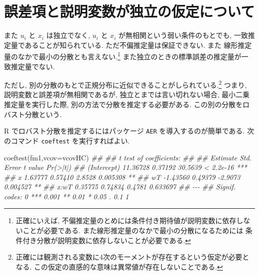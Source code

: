 \documentclass[
  letterpaper,
  xelatex,
  ja=standard, xelatex]{bxjsbook}
\newenvironment{Shaded}{\begin{snugshade}}{\end{snugshade}}
\newcommand{\AttributeTok}[1]{\textcolor[rgb]{0.40,0.45,0.13}{#1}}
\newcommand{\DocumentationTok}[1]{\textcolor[rgb]{0.37,0.37,0.37}{\textit{#1}}}
\newcommand{\FunctionTok}[1]{\textcolor[rgb]{0.28,0.35,0.67}{#1}}
\newcommand{\NormalTok}[1]{\textcolor[rgb]{0.00,0.23,0.31}{#1}}
\begin{document}
\section{誤差項と説明変数が独立の仮定について}\label{ux8aa4ux5deeux9805ux3068ux8aacux660eux5909ux6570ux304cux72ecux7acbux306eux4eeeux5b9aux306bux3064ux3044ux3066}

また \(u_i\) と \(x_i\) は独立でなく, \(u_i\) と \(x_i\)
が無相関という弱い条件のもとでも, 一致推定量であることが知られている.
ただ不偏推定量は保証できない. また
線形推定量のなかで最小の分散とも言えない.\footnote{正確にいえば,
  不偏推定量のとめには条件付き期待値が説明変数に依存しないことが必要である.
  また線形推定量のなかで最小の分散になるためには
  条件付き分散が説明変数に依存しないことが必要である.}
また独立のときの標準誤差の推定量が一致推定量でない.

ただし,
別の分散のもとで正規分布に近似できることがしられている.\footnote{正確には観測される変数に4次のモーメントが存在するという仮定が必要となる.
  この仮定の直感的な意味は異常値が存在しないことである.} つまり,
説明変数と誤差項が無相関であるが, 独立とまでは言い切れない場合,
最小二乗推定量を実行した際, 別の方法で分散を推定する必要がある.
この別の分散をロバスト分散という.

R でロバスト分散を推定するにはパッケージ \texttt{AER}
を導入するのが簡単である. 次のコマンド \texttt{coeftest}
を実行すればよい.

\begin{Shaded}
\begin{Highlighting}[]
\FunctionTok{coeftest}\NormalTok{(fm1,}\AttributeTok{vcov=}\NormalTok{vcovHC)}
\DocumentationTok{\#\# }
\DocumentationTok{\#\# t test of coefficients:}
\DocumentationTok{\#\# }
\DocumentationTok{\#\#             Estimate Std. Error t value  Pr(\textgreater{}|t|)    }
\DocumentationTok{\#\# (Intercept) 11.36728    0.37192 30.5639 \textless{} 2.2e{-}16 ***}
\DocumentationTok{\#\# x            1.63777    0.57410  2.8528  0.005308 ** }
\DocumentationTok{\#\# wT          {-}1.43560    0.49379 {-}2.9073  0.004527 ** }
\DocumentationTok{\#\# x:wT         0.35775    0.74834  0.4781  0.633697    }
\DocumentationTok{\#\# {-}{-}{-}}
\DocumentationTok{\#\# Signif. codes:  0 \textquotesingle{}***\textquotesingle{} 0.001 \textquotesingle{}**\textquotesingle{} 0.01 \textquotesingle{}*\textquotesingle{} 0.05 \textquotesingle{}.\textquotesingle{} 0.1 \textquotesingle{} \textquotesingle{} 1}
\end{Highlighting}
\end{Shaded}
\end{document}
